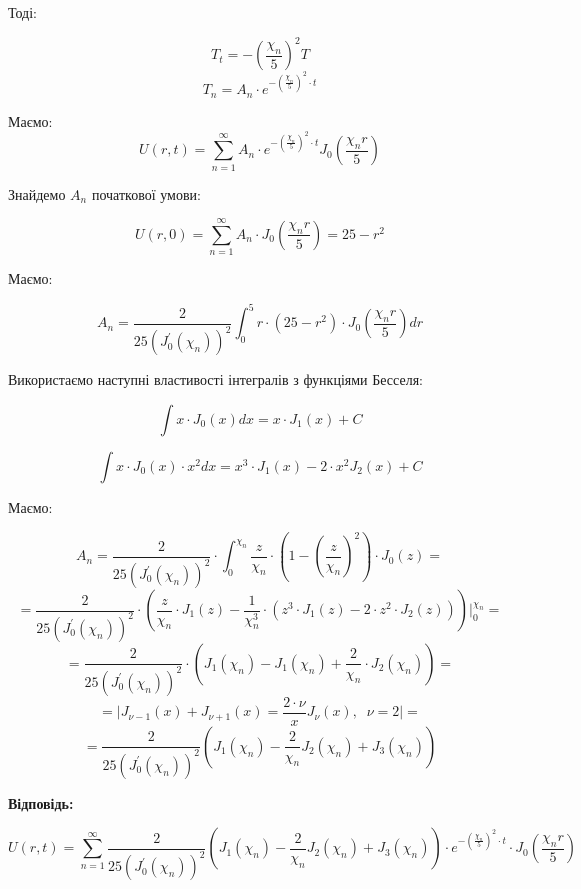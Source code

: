 \documentclass[]{article}
\begin{document}
Тоді:

\[T_{t} = -\left(\frac{\chi_n}{5}\right)^2T\]
\[T_n = A_n\cdot e^{-\left(\frac{\chi_n}{5}\right)^2\cdot t}\]

Маємо:
\[U(r,t) = \sum_{n=1}^{\infty}A_n\cdot e^{-\left(\frac{\chi_n}{5}\right)^2\cdot t}J_0\left(\frac{\chi_n r}{5}\right)\]

Знайдемо $A_n$ початкової умови:

\[U(r,0) = \sum_{n=1}^{\infty}A_n\cdot J_0\left(\frac{\chi_n r}{5}\right) = 25 - r^2\]

Маємо:

\[A_n = \frac{2}{25\left(J_0^{'}(\chi_n)\right)^2}\int_{0}^{5}r\cdot \left(25-r^2\right)\cdot J_0\left(\frac{\chi_n r}{5}\right)dr\]

Використаємо наступні властивості інтегралів з функціями Бесселя:

\[\int x\cdot J_0(x) dx = x\cdot J_1(x) + C\]

\[\int x\cdot J_0(x)\cdot x^2 dx = x^3\cdot J_1(x) - 2\cdot x^2 J_2(x)+ C\]

Маємо:

\[A_n = \frac{2}{25\left(J_0^{'}(\chi_n)\right)^2}\cdot\int_{0}^{\chi_n} \frac{z}{\chi_n}\cdot\left(1-\left(\frac{z}{\chi_n}\right)^2\right)\cdot J_0\left(z\right) = \]
\[ = \frac{2}{25\left(J_0^{'}(\chi_n)\right)^2} \cdot \left(\frac{z}{\chi_n}\cdot J_1(z)-\frac{1}{\chi_n^3}\cdot\left(z^3\cdot J_1(z)-2\cdot z^2\cdot J_2(z)\right)\right)\big|_0^{\chi_n} = \]
\[ = \frac{2}{25\left(J_0^{'}(\chi_n)\right)^2} \cdot \left( J_1(\chi_n) - J_1(\chi_n)+\frac{2}{\chi_n}\cdot J_2 (\chi_n)\right) = \]
\[ = \big| J_{\nu-1}(x)+J_{\nu+1}(x) = \frac{2\cdot\nu}{x}J_\nu(x),\;\;\nu=2 \big| = \]
\[= \frac{2}{25\left(J_0^{'}(\chi_n)\right)^2}\left(J_1(\chi_n)-\frac{2}{\chi_n}J_2(\chi_n)+J_3(\chi_n)\right)\]

\textbf{Відповідь:}

\[U(r,t) = \sum_{n=1}^{\infty} \frac{2}{25\left(J_0^{'}(\chi_n)\right)^2}\left(J_1(\chi_n)-\frac{2}{\chi_n}J_2(\chi_n)+J_3(\chi_n)\right)\cdot e^{-\left(\frac{\chi_n}{5}\right)^2\cdot t}\cdot J_0\left(\frac{\chi_n r}{5}\right)\]
\end{document}
